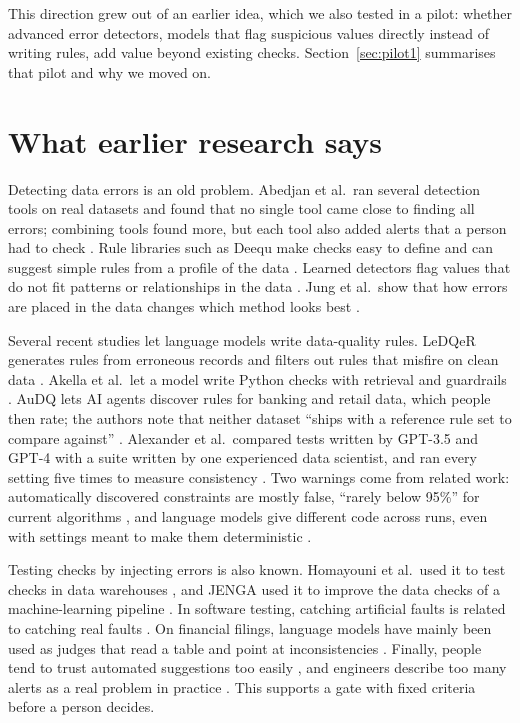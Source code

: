 \documentclass[11pt,a4paper]{article}
\begin{document}
This direction grew out of an earlier idea, which we also tested in a pilot: whether advanced error detectors, models that flag suspicious values directly instead of writing rules, add value beyond existing checks. Section~\ref{sec:pilot1} summarises that pilot and why we moved on.

\section{What earlier research says}

Detecting data errors is an old problem. Abedjan et al.\ ran several detection tools on real datasets and found that no single tool came close to finding all errors; combining tools found more, but each tool also added alerts that a person had to check \cite{abedjan}. Rule libraries such as Deequ make checks easy to define and can suggest simple rules from a profile of the data \cite{deequ}. Learned detectors flag values that do not fit patterns or relationships in the data \cite{cdc,raha,zeroed,autotest}. Jung et al.\ show that how errors are placed in the data changes which method looks best \cite{taberr}.

Several recent studies let language models write data-quality rules. LeDQeR generates rules from erroneous records and filters out rules that misfire on clean data \cite{ledqer}. Akella et al.\ let a model write Python checks with retrieval and guardrails \cite{akella}. AuDQ lets AI agents discover rules for banking and retail data, which people then rate; the authors note that neither dataset ``ships with a reference rule set to compare against'' \cite{audq}. Alexander et al.\ compared tests written by GPT-3.5 and GPT-4 with a suite written by one experienced data scientist, and ran every setting five times to measure consistency \cite{alexander}. Two warnings come from related work: automatically discovered constraints are mostly false, ``rarely below 95\%'' for current algorithms \cite{martin}, and language models give different code across runs, even with settings meant to make them deterministic \cite{ouyang}.

Testing checks by injecting errors is also known. Homayouni et al.\ used it to test checks in data warehouses \cite{homayouni}, and JENGA used it to improve the data checks of a machine-learning pipeline \cite{jenga}. In software testing, catching artificial faults is related to catching real faults \cite{just}. On financial filings, language models have mainly been used as judges that read a table and point at inconsistencies \cite{secfintables,finauditing}. Finally, people tend to trust automated suggestions too easily \cite{parasuraman}, and engineers describe too many alerts as a real problem in practice \cite{shankar}. This supports a gate with fixed criteria before a person decides.
\end{document}
